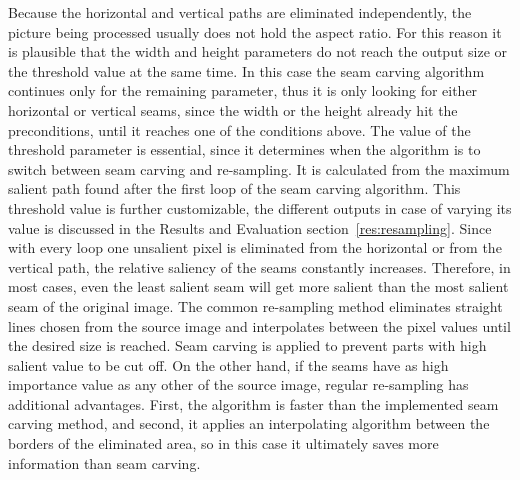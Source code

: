\documentclass[draft,final]{vutinfth} %
\begin{document}
	Because the horizontal and vertical paths are eliminated independently, the picture being processed usually does not hold the aspect ratio.
	For this reason it is plausible that the width and height parameters do not reach the output size or the threshold value at the same time.
	In this case the seam carving algorithm continues only for the remaining parameter, thus it is only looking for either horizontal or vertical seams, since the width or the height already hit the preconditions, until it reaches one of the conditions above. 
	The value of the threshold parameter is essential,	since it determines when the algorithm is to switch between seam carving and re-sampling. 
	It is calculated from the maximum salient path found after the first loop of the seam carving algorithm.
	This threshold value is further customizable, the different outputs in case of varying its value is discussed in the Results and Evaluation section~\ref{res:resampling}.
	Since with every loop one unsalient pixel is eliminated from the horizontal or from the vertical path, the relative saliency of the seams constantly increases.
	Therefore, in most cases, even the least salient seam will get more salient than the most salient seam of the original image. 
	The common re-sampling method eliminates straight lines chosen from the source image and interpolates between the pixel values until the desired size is reached.
	Seam carving is applied to prevent parts with high salient value to be cut off.
	On the other hand, if the seams have as high importance value as any other of the source image, regular re-sampling has additional advantages.
	First, the algorithm is faster than the implemented seam carving method, and second, it applies an interpolating algorithm between the borders of the eliminated area, so in this case it ultimately saves more information than seam carving.   

	
\end{document}
